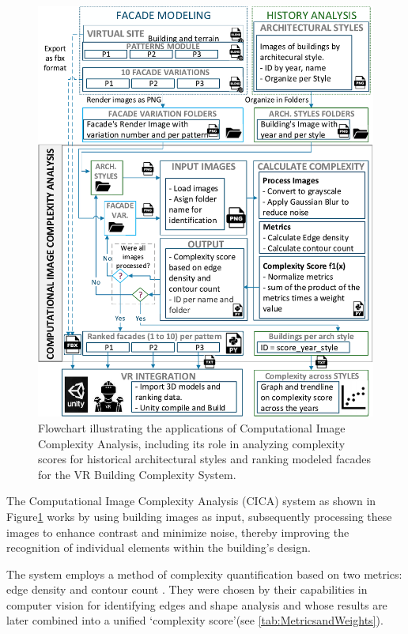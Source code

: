     \begin{figure}[!htb]
      \centering
      \includegraphics[width= \linewidth, trim=0 0 0 0, clip]{Images/ImageComplexityAnalysisFlowchart}
      \caption{Flowchart illustrating the applications of Computational Image Complexity Analysis, including its role in analyzing complexity scores for historical architectural styles and ranking modeled facades for the VR Building Complexity System.}
      \label{fig:ImageComplexityAnalysisFlowchart}
    \end{figure}

The Computational Image Complexity Analysis (CICA) system as shown in Figure\ref{fig:ImageComplexityAnalysisFlowchart} works by using building images as input, subsequently processing these images to enhance contrast and minimize noise, thereby improving the recognition of individual elements within the building's design.

The system employs a method of complexity quantification based on two metrics: edge density and contour count .
They were chosen by their capabilities in computer vision for identifying edges and shape analysis and whose results are later combined into a unified `complexity score'(see \ref{tab:MetricsandWeights}).


